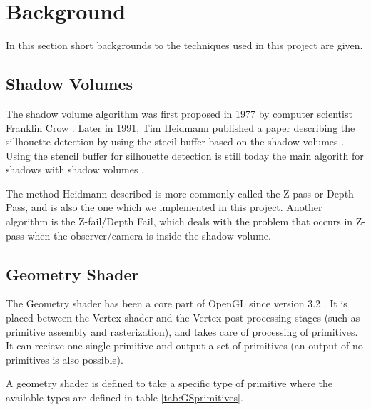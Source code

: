 \documentclass[a4paper, 12pt]{article}
\begin{document}
\section{Background}
In this section short backgrounds to the techniques used in this project are given.
\subsection{Shadow Volumes}
The shadow volume algorithm was first proposed in 1977 by computer scientist Franklin Crow \cite{CROW77}. Later in 1991, Tim Heidmann published a paper describing the sillhouette detection by using the stecil buffer based on the shadow volumes \cite{HEIDMANN91}. Using the stencil buffer for silhouette detection is still today the main algorith for shadows with shadow volumes \cite{KOLIVAND13}. 

The method Heidmann described is more commonly called the Z-pass or Depth Pass, and is also the one which we implemented in this project. Another algorithm is the Z-fail/Depth Fail, which deals with the problem that occurs in Z-pass when the observer/camera is inside the shadow volume. 
\subsection{Geometry Shader}
The Geometry shader has been a core part of OpenGL since version 3.2 \cite{GEOM}. It is placed between the Vertex shader and the Vertex post-processing stages (such as primitive assembly and rasterization), and takes care of processing of primitives. It can recieve one single primitive and output a set of primitives (an output of no primitives is also possible).

A geometry shader is defined to take a specific type of primitive where the available types are defined in table \ref{tab:GSprimitives}.
\end{document}
